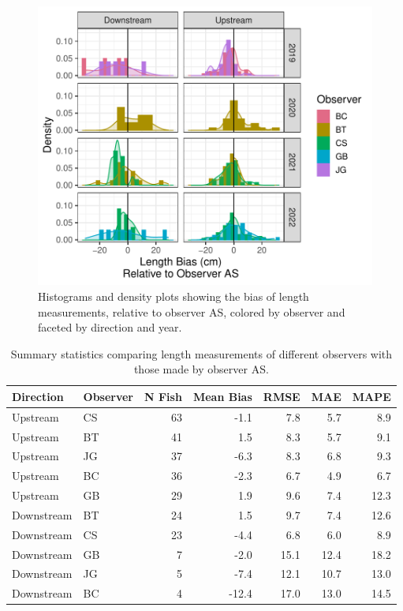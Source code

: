\documentclass[
]{article}
\begin{document}
\begin{figure}
\centering
\includegraphics{../figures/lgth-comp-fig-1.pdf}
\caption{\label{fig:lgth-comp-fig}Histograms and density plots showing the bias of length measurements, relative to observer AS, colored by observer and faceted by direction and year.}
\end{figure}

\begin{table}[!h]

\caption{\label{tab:lgth-comp-tab}Summary statistics comparing length measurements of different observers with those made by observer AS.}
\centering
\begin{tabular}[t]{llrrrrr}
\toprule
Direction & Observer & N Fish & Mean Bias & RMSE & MAE & MAPE\\
\midrule
Upstream & CS & 63 & -1.1 & 7.8 & 5.7 & 8.9\\
Upstream & BT & 41 & 1.5 & 8.3 & 5.7 & 9.1\\
Upstream & JG & 37 & -6.3 & 8.3 & 6.8 & 9.3\\
Upstream & BC & 36 & -2.3 & 6.7 & 4.9 & 6.7\\
\midrule
Upstream & GB & 29 & 1.9 & 9.6 & 7.4 & 12.3\\
Downstream & BT & 24 & 1.5 & 9.7 & 7.4 & 12.6\\
Downstream & CS & 23 & -4.4 & 6.8 & 6.0 & 8.9\\
Downstream & GB & 7 & -2.0 & 15.1 & 12.4 & 18.2\\
Downstream & JG & 5 & -7.4 & 12.1 & 10.7 & 13.0\\
Downstream & BC & 4 & -12.4 & 17.0 & 13.0 & 14.5\\
\bottomrule
\end{tabular}
\end{table}
\end{document}
